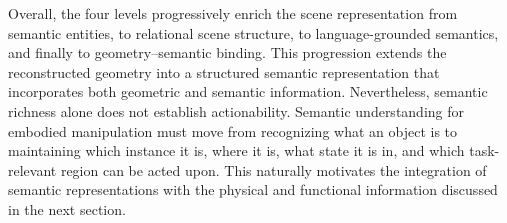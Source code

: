 \documentclass{SCIS2026}
\begin{document}
Overall, the four levels progressively enrich the scene representation from semantic entities, to relational scene structure, to language-grounded semantics, and finally to geometry–semantic binding. This progression extends the reconstructed geometry into a structured semantic representation that incorporates both geometric and semantic information. Nevertheless, semantic richness alone does not establish actionability. Semantic understanding for embodied manipulation must move from recognizing what an object is to maintaining which instance it is, where it is, what state it is in, and which task-relevant region can be acted upon. This naturally motivates the integration of semantic representations with the physical and functional information discussed in the next section.




\newcommand{\CenterCellB}[1]{%
\begin{minipage}[t][2.55cm][t]{\linewidth}
\centering
\vspace{0.05cm}
#1
\end{minipage}%
}

\newcommand{\LeftCellB}[1]{%
\begin{minipage}[t][2.55cm][t]{\linewidth}
\raggedright
\vspace{0.05cm}
#1
\end{minipage}%
}

\newcommand{\CategoryCellB}[1]{%
\begin{minipage}[c]{\linewidth}
\raggedright
\setlength{\parindent}{0pt}%
\vspace*{1pt}
\noindent\ignorespaces#1\unskip\par
\vspace*{1pt}
\end{minipage}%
}

\newcommand{\strengthB}[1]{%
\textcolor{BlueText}{\textbf{Strength: }}#1%
}

\newcommand{\limitationB}[1]{%
\textcolor{GreenText}{\textbf{Limitation: }}#1%
}


\end{document}
